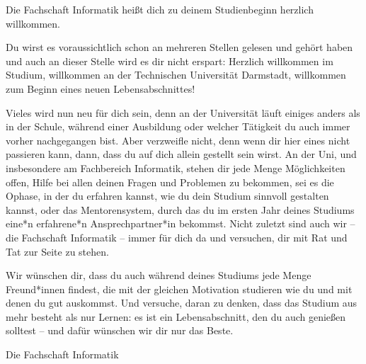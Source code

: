{Die Fachschaft Informatik heißt dich zu deinem Studienbeginn herzlich willkommen.}{
Du wirst es voraussichtlich schon an mehreren Stellen gelesen und gehört haben und auch an dieser Stelle wird es dir nicht erspart: Herzlich willkommen im Studium, willkommen an der Technischen Universität Darmstadt, willkommen zum Beginn eines neuen Lebensabschnittes!

Vieles wird nun neu für dich sein, denn an der Universität läuft einiges anders als in der Schule, während einer Ausbildung oder welcher Tätigkeit du auch immer vorher nachgegangen bist. Aber verzweifle nicht, denn wenn dir hier eines nicht passieren kann, dann, dass du auf dich allein gestellt sein wirst. An der Uni, und insbesondere am Fachbereich Informatik, stehen dir jede Menge Möglichkeiten offen, Hilfe bei allen deinen Fragen und Problemen zu bekommen, sei es die Ophase, in der du erfahren kannst, wie du dein Studium sinnvoll gestalten kannst, oder das Mentorensystem, durch das du im ersten Jahr deines Studiums eine*n erfahrene*n Ansprechpartner*in bekommst. Nicht zuletzt sind auch wir – die Fachschaft Informatik – immer für dich da und versuchen, dir mit Rat und Tat zur Seite zu stehen.

Wir wünschen dir, dass du auch während deines Studiums jede Menge Freund*innen findest, die mit der gleichen Motivation studieren wie du und mit denen du gut auskommst. Und versuche, daran zu denken, dass das Studium aus mehr besteht als nur Lernen: es ist ein Lebensabschnitt, den du auch genießen solltest – und dafür wünschen wir dir nur das Beste.
}
{Die Fachschaft Informatik}

\vfill

\noindent
{}

\newpage
